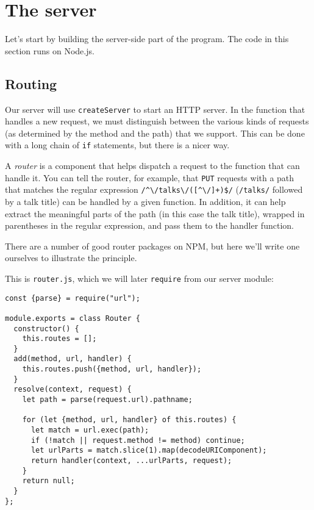 \section{The server}

Let's start by building the server-side part of the program. The code in this section runs on Node.js.

\subsection{Routing}

Our server will use \lstinline`createServer` to start an HTTP server. In the function that handles a new request, we must distinguish between the various kinds of requests (as determined by the method and the path) that we support. This can be done with a long chain of \lstinline`if` statements, but there is a nicer way.

A \emph{router} is a component that helps dispatch a request to the function that can handle it. You can tell the router, for example, that \lstinline`PUT` requests with a path that matches the regular expression \lstinline`/^\/talks\/([^\/]+)$/` (\lstinline`/talks/` followed by a talk title) can be handled by a given function. In addition, it can help extract the meaningful parts of the path (in this case the talk title), wrapped in parentheses in the regular expression, and pass them to the handler function.

There are a number of good router packages on NPM, but here we'll write one ourselves to illustrate the principle.

This is \lstinline`router.js`, which we will later \lstinline`require` from our server module:

\begin{lstlisting}
const {parse} = require("url");

module.exports = class Router {
  constructor() {
    this.routes = [];
  }
  add(method, url, handler) {
    this.routes.push({method, url, handler});
  }
  resolve(context, request) {
    let path = parse(request.url).pathname;

    for (let {method, url, handler} of this.routes) {
      let match = url.exec(path);
      if (!match || request.method != method) continue;
      let urlParts = match.slice(1).map(decodeURIComponent);
      return handler(context, ...urlParts, request);
    }
    return null;
  }
};
\end{lstlisting}
\noindent{}

